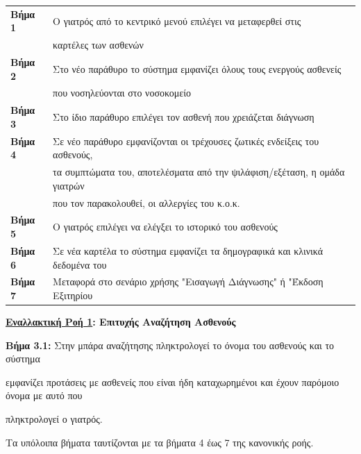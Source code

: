 \documentclass{article}
\newcommand\T{\rule{0pt}{2.6ex}}       %
\newcommand\B{\rule[-1.2ex]{0pt}{0pt}}
\begin{document}
 \begin{center}
     \begin{tabular}{|l|l|}
     \hline
      \textbf{Βήμα 1} & Ο γιατρός από το κεντρικό μενού επιλέγει να μεταφερθεί στις \T \\& καρτέλες των ασθενών \B \\
      \hline
      \textbf{Βήμα 2} &  Στο νέο παράθυρο το σύστημα εμφανίζει όλους τους ενεργούς ασθενείς \T \\& που νοσηλεύονται στο νοσοκομείο \B \\
      \hline
      \textbf{Βήμα 3} & Στο ίδιο παράθυρο επιλέγει τον ασθενή που χρειάζεται διάγνωση \T\B \\
      \hline
      \textbf{Βήμα 4} & Σε νέο παράθυρο εμφανίζονται οι τρέχουσες ζωτικές ενδείξεις του ασθενούς, \T \\& τα συμπτώματα του, αποτελέσματα από την ψιλάφιση/εξέταση, η ομάδα γιατρών \\& που τον παρακολουθεί, οι αλλεργίες του κ.ο.κ. \B \\
      \hline
      \textbf{Βήμα 5} & Ο γιατρός επιλέγει να ελέγξει το ιστορικό του ασθενούς \T\B \\
      \hline
      \textbf{Βήμα 6} & Σε νέα καρτέλα το σύστημα εμφανίζει τα δημογραφικά και κλινικά δεδομένα του \T\B \\
      \hline
      \textbf{Βήμα 7} & Μεταφορά στο σενάριο χρήσης "Εισαγωγή Διάγνωσης" ή "Έκδοση Εξιτηρίου\T\B \\
      \hline      
     
     \end{tabular}
 \end{center}
 
 \textbf{\underline{Εναλλακτική Ροή 1}: Επιτυχής Αναζήτηση Ασθενούς} \vspace{0.2cm}
\par \textbf{Βήμα 3.1:} Στην μπάρα αναζήτησης πληκτρολογεί το όνομα του ασθενούς και το σύστημα \par εμφανίζει προτάσεις με ασθενείς που είναι ήδη καταχωρημένοι και έχουν παρόμοιο όνομα με αυτό που \par πληκτρολογεί ο γιατρός.\vspace{0.1cm} 
\par Τα υπόλοιπα βήματα ταυτίζονται με τα βήματα 4 έως 7 της κανονικής ροής.

\vspace{0.2cm}
\end{document}
